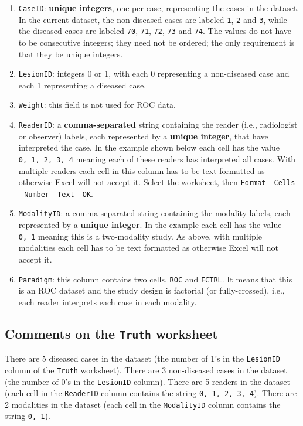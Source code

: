 \documentclass[
]{book}
\begin{document}
\begin{enumerate}
\def\labelenumi{\arabic{enumi}.}
\item
  \texttt{CaseID}: \textbf{unique integers}, one per case, representing the cases in the dataset. In the current dataset, the non-diseased cases are labeled \texttt{1}, \texttt{2} and \texttt{3}, while the diseased cases are labeled \texttt{70}, \texttt{71}, \texttt{72}, \texttt{73} and \texttt{74}. The values do not have to be consecutive integers; they need not be ordered; the only requirement is that they be unique integers.
\item
  \texttt{LesionID}: integers 0 or 1, with each 0 representing a non-diseased case and each 1 representing a diseased case.
\item
  \texttt{Weight}: this field is not used for ROC data.
\item
  \texttt{ReaderID}: a \textbf{comma-separated} string containing the reader (i.e., radiologist or observer) labels, each represented by a \textbf{unique integer}, that have interpreted the case. In the example shown below each cell has the value \texttt{0,\ 1,\ 2,\ 3,\ 4} meaning each of these readers has interpreted all cases. With multiple readers each cell in this column has to be text formatted as otherwise Excel will not accept it. Select the worksheet, then \texttt{Format} - \texttt{Cells} - \texttt{Number} - \texttt{Text} - \texttt{OK}.
\item
  \texttt{ModalityID}: a comma-separated string containing the modality labels, each represented by a \textbf{unique integer}. In the example each cell has the value \texttt{0,\ 1} meaning this is a two-modality study. As above, with multiple modalities each cell has to be text formatted as otherwise Excel will not accept it.
\item
  \texttt{Paradigm}: this column contains two cells, \texttt{ROC} and \texttt{FCTRL}. It means that this is an ROC dataset and the study design is factorial (or fully-crossed), i.e., each reader interprets each case in each modality.
\end{enumerate}

\hypertarget{quick-start-roc-truth-comments}{%
\subsection{\texorpdfstring{Comments on the \texttt{Truth} worksheet}{Comments on the Truth worksheet}}\label{quick-start-roc-truth-comments}}

There are 5 diseased cases in the dataset (the number of 1's in the \texttt{LesionID} column of the \texttt{Truth} worksheet). There are 3 non-diseased cases in the dataset (the number of 0's in the \texttt{LesionID} column). There are 5 readers in the dataset (each cell in the \texttt{ReaderID} column contains the string \texttt{0,\ 1,\ 2,\ 3,\ 4}). There are 2 modalities in the dataset (each cell in the \texttt{ModalityID} column contains the string \texttt{0,\ 1}).
\end{document}
